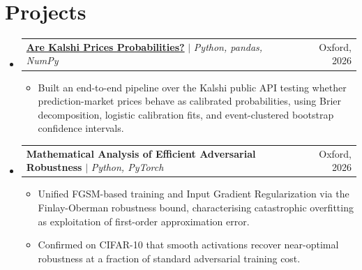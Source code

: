 \documentclass[letterpaper,11pt]{article}
\makeatletter
\newcommand{\resumeItem}[1]{
  \item\small{
    {#1 \vspace{-1pt}}
  }
}
\newcommand{\resumeProjectHeading}[2]{
    \vspace{-2pt}\item
    \begin{tabular*}{0.97\textwidth}{l@{\extracolsep{\fill}}r}
      \small#1 & #2 \\
    \end{tabular*}\vspace{-5pt}
}
\newcommand{\resumeSubHeadingListStart}{\begin{itemize}[leftmargin=0.15in, label={}]}
\newcommand{\resumeSubHeadingListEnd}{\end{itemize}}
\newcommand{\resumeItemListStart}{\begin{itemize}\vspace{-2pt}}
\newcommand{\resumeItemListEnd}{\end{itemize}\vspace{-7pt}}
\makeatother
\begin{document}


\section{Projects}
\resumeSubHeadingListStart

\resumeProjectHeading
{\textbf{\href{https://himetsai.com/blog/kalshi}{Are Kalshi Prices Probabilities?}} $|$ \textit{Python, pandas, NumPy}}{Oxford, 2026}
\resumeItemListStart
  \resumeItem{Built an end-to-end pipeline over the Kalshi public API testing whether prediction-market prices behave as calibrated probabilities, using Brier decomposition, logistic calibration fits, and event-clustered bootstrap confidence intervals.}
\resumeItemListEnd

\resumeProjectHeading
  {\textbf{Mathematical Analysis of Efficient Adversarial Robustness} $|$ \textit{Python, PyTorch}}{Oxford, 2026}
  \resumeItemListStart
    \resumeItem{Unified FGSM-based training and Input Gradient Regularization via the Finlay-Oberman robustness bound, characterising catastrophic overfitting as exploitation of first-order approximation error.}
    \resumeItem{Confirmed on CIFAR-10 that smooth activations recover near-optimal robustness at a fraction of standard adversarial training cost.}
  \resumeItemListEnd

\resumeSubHeadingListEnd
\end{document}
